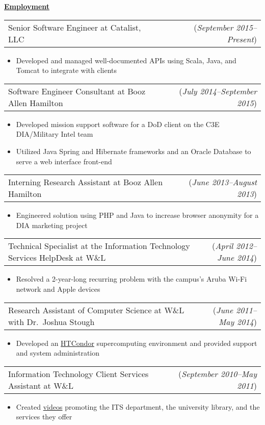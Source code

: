 \documentclass[11pt, letterpaper]{letter}
\makeatletter
\newlength{\indwidth}            \setlength{\indwidth}{\textwidth-.4in}
\newlength{\listSpacing}         \setlength{\listSpacing}{.0375in}
\newlength{\headerAntispace}     \setlength{\headerAntispace}{-6pt}
\newlength{\subListAntispace}    \setlength{\subListAntispace}{-.25in}
\newlength{\subListMidAntispace} \setlength{\subListMidAntispace}{-2.5pt}
\newlength{\subListEndAntispace} \setlength{\subListEndAntispace}{-.075in}
\newcommand{\lst}[1]{
    \vspace{\subListAntispace}
    \begin{itemize}
        \item #1
    \end{itemize}
    \vspace{\subListEndAntispace}
}
\newcommand{\dated}[2]{
    \begin{tabular*}{\indwidth}{l@{\extracolsep{\fill}}r}
        #1 & (\textit{#2})
    \end{tabular*}
}
\newcommand{\datedTwo}[3]{
    \begin{tabular*}{\indwidth}{l@{\extracolsep{\fill}}r}
        #1 & (\textit{#2}) (\textit{#3})
    \end{tabular*}
}
\newcommand{\myul}[3]{
    \begingroup
        \renewcommand{\ULdepth}{#1}
        \renewcommand{\ULthickness}{#2}
        \uline{#3}
    \endgroup
}
\newcommand{\sectionheader}[1]{
    \myul{2.7pt}{0.5pt}{\large \textbf{#1}}
}
\makeatother
\begin{document}

\sectionheader{Employment}
\vspace{\headerAntispace}
\begin{itemize}{%
    \setlength{\itemsep}{\listSpacing}
    \item \dated{Senior Software Engineer at Catalist, LLC}{September 2015--Present}
    \lst{%
        Developed and managed well-documented APIs using Scala, Java, and Tomcat to integrate with clients
    }
    \item \dated{%
        Software Engineer Consultant at Booz Allen Hamilton
    }{July 2014--September 2015}
    \lst{%
        Developed mission support software for a DoD client on the C3E DIA/Military Intel team
    \vspace{\subListMidAntispace}
    \item {%
        Utilized Java Spring and Hibernate frameworks and an Oracle Database to serve a web interface front-end
    }
    \vspace{\subListMidAntispace}
    }
    \item \dated{%
        Interning Research Assistant at Booz Allen Hamilton
    }{June 2013--August 2013}
    \lst{%
        Engineered solution using PHP and Java to increase browser anonymity for a DIA marketing project
    }
    \item \dated{%
        Technical Specialist at the Information Technology Services HelpDesk at W\&L
    }{April 2012--June 2014}
    \lst{%
        Resolved a 2-year-long recurring problem with the campus's Aruba Wi-Fi network and Apple devices
    }
    \item \dated{%
        Research Assistant of Computer Science at W\&L with Dr.\ Joshua Stough
    }{June 2011--May 2014}
    \lst{%
        Developed an \href{http://www.htcondorproject.org/}{HTCondor} supercomputing environment and provided support
        and system administration
    }
    \item \dated{%
        Information Technology Client Services Assistant at W\&L
    }{September 2010--May 2011}
    \lst{%
        Created \href{http://youtu.be/NvOarFOmly0?hd=1}{videos} promoting the ITS department, the university library,
        and the services they offer
    }
    \iftoggle{smithbros}{%
        \item \datedTwo{%
            File Digitizer at Smith Brothers Abstract and Title Co.
        }{June 2009--August 2009}{June 2010--August 2010}
    }{}
}\end{itemize}
\end{document}
